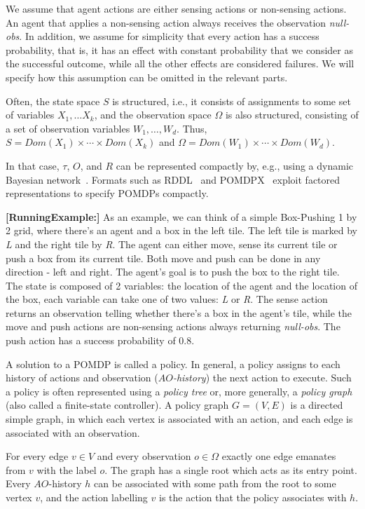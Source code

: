 \documentclass[letterpaper]{article} %
\newcommand{\RE}[1]{\textbf{[\color{purple}RunningExample:#1]}}
\begin{document}
We assume that agent actions are either sensing actions or non-sensing actions. An agent that applies a non-sensing action always receives the observation {\em null-obs}. In addition, we assume for simplicity that every action has a success probability, that is, it has an effect with constant probability that we consider as the successful outcome, while all the other effects are considered failures. We will specify how this assumption can be omitted in the relevant parts.

Often, the state space $S$ is structured, i.e., it consists of assignments to some set of variables $X_1,\ldots X_k$, and the observation space $\Omega$ is
also structured, consisting of a set of observation variables $W_1,\ldots, W_d$. 
Thus, $S=Dom(X_1)\times\cdots\times Dom(X_k)$ and
$\Omega = Dom(W_1)\times\cdots\times Dom(W_d)$. 

In that case, $\tau$, $O$, and $R$ can be represented compactly by, e.g., using a dynamic Bayesian network~\cite{}. Formats such as RDDL~\cite{} and POMDPX~\cite{} exploit factored representations to specify POMDPs compactly.

\RE{}
As an example, we can think of a simple Box-Pushing 1 by 2 grid, where there's an agent and a box in the left tile. The left tile is marked by \emph{L} and the right tile by \emph{R}. The agent can either move, sense its current tile or push a box from its current tile. Both move and push can be done in any direction - left and right. The agent's goal is to push the box to the right tile.
The state is composed of 2 variables: the location of the agent and the location of the box, each variable can take one of two values: \emph{L} or \emph{R}.
The sense action returns an observation telling whether there's a box in the agent's tile, while the move and push actions are non-sensing actions always returning {\em null-obs}.
The push action has a success probability of 0.8.

A solution to a POMDP is called a policy. In general, a policy assigns to each history of actions and observation ({\em $AO$-history}) the next action to execute. 
Such a policy is often represented using a {\em policy tree} or, more generally, a {\em policy graph} (also called a finite-state controller). 
A policy graph $G=(V,E)$ is a directed simple graph, in which each vertex is associated with an action, and each edge is associated with an observation.

For every edge $v\in V$ and every observation $o\in\Omega$ exactly one edge emanates from $v$ with the label $o$.
The graph has a single root which acts as its entry point. Every $AO$-history $h$ can be associated with some path from the root to some vertex $v$,
and the action labelling $v$ is the action that the policy associates with $h$.
\end{document}
